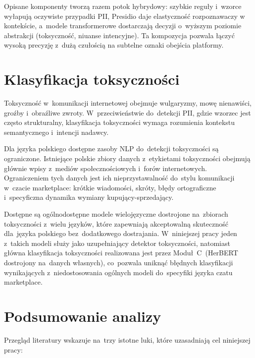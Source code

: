 Opisane komponenty tworzą razem potok hybrydowy: szybkie reguły i~wzorce wyłapują oczywiste
przypadki PII, Presidio daje elastyczność rozpoznawaczy w kontekście, a~modele transformerowe
dostarczają decyzji o~wyższym poziomie abstrakcji (toksyczność, niuanse intencyjne). Ta
kompozycja pozwala łączyć wysoką precyzję z~dużą czułością na subtelne oznaki obejścia platformy.

\section{Klasyfikacja toksyczności}
\label{sec:toxicity}

Toksyczność w~komunikacji internetowej obejmuje wulgaryzmy, mowę nienawiści,
groźby i~obraźliwe zwroty. W~przeciwieństwie do~detekcji PII, gdzie wzorzec
jest często strukturalny, klasyfikacja toksyczności wymaga rozumienia kontekstu
semantycznego i~intencji nadawcy.

Dla języka polskiego dostępne zasoby NLP do~detekcji toksyczności są ograniczone.
Istniejące polskie zbiory danych z~etykietami toksyczności obejmują głównie
wpisy z~mediów społecznościowych i~forów internetowych. Ograniczeniem
tych danych jest ich nieprzystawalność do~stylu komunikacji w~czacie marketplace:
krótkie wiadomości, skróty, błędy ortograficzne i~specyficzna dynamika
wymiany kupujący-sprzedający.

Dostępne są ogólnodostępne modele wielojęzyczne dostrojone na~zbiorach
toksyczności z~wielu języków, które zapewniają akceptowalną skuteczność
dla~języka polskiego bez~dodatkowego dostrajania. W~niniejszej pracy
jeden z~takich modeli służy jako uzupełniający detektor toksyczności, natomiast główna klasyfikacja toksyczności
realizowana jest przez Moduł~C~(HerBERT dostrojony na~danych własnych),
co~pozwala uniknąć błędnych klasyfikacji wynikających z~niedostosowania
ogólnych modeli do~specyfiki języka czatu marketplace.

\section{Podsumowanie analizy}
\label{sec:analiza-podsumowanie}

Przegląd literatury wskazuje na~trzy istotne luki, które uzasadniają
cel niniejszej pracy:

